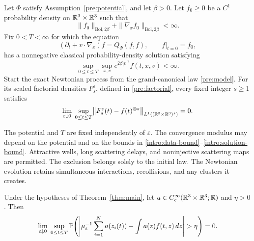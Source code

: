 \begin{maintheorem}\label{thm:main}
Let $\Phi$ satisfy Assumption~\ref{pre:potential}, and let $\beta>0$.
Let $f_0\ge0$ be a $C^1$ probability density on $\mathbb R^3\times\mathbb R^3$ such that
\begin{equation}\label{intro:data-bound}
 \|f_0\|_{\mathrm{Bol},2\beta}
 +\|\nabla_xf_0\|_{\mathrm{Bol},2\beta}<\infty.
\end{equation}
Fix $0<T<\infty$ for which the equation
\begin{equation}\label{intro:boltzmann}
 (\partial_t+v\cdot\nabla_x)f=Q_\Phi(f,f),
 \qquad f|_{t=0}=f_0,
\end{equation}
has a nonnegative classical probability-density solution satisfying
\begin{equation}\label{intro:solution-bound}
 \sup_{0\le t\le T}\sup_{x,v}
 e^{2\beta|v|^2}f(t,x,v)<\infty.
\end{equation}
Start the exact Newtonian process from the grand-canonical law
\eqref{pre:model}. For its scaled factorial densities
$F_s^\varepsilon$, defined in \eqref{pre:factorial}, every fixed
integer $s\ge1$ satisfies
\begin{equation}\label{intro:chaos}
 \lim_{\varepsilon\downarrow0}\;
 \sup_{0\le t\le T}
 \bigl\|F_s^\varepsilon(t)-f(t)^{\otimes s}\bigr\|_
 {L^1((\mathbb R^3\times\mathbb R^3)^s)}=0.
\end{equation}
\end{maintheorem}

The potential and $T$ are fixed independently of $\varepsilon$.
The convergence modulus may depend on the potential and on the bounds
in \eqref{intro:data-bound}--\eqref{intro:solution-bound}.
Attractive wells, long scattering delays, and noninjective scattering
maps are permitted. The exclusion belongs solely to the initial law.
The Newtonian evolution retains simultaneous interactions,
recollisions, and any clusters it creates.

\begin{maincorollary}\label{cor:empirical}
Under the hypotheses of Theorem~\ref{thm:main}, let
$a\in C_c^\infty(\mathbb R^3\times\mathbb R^3;\mathbb R)$ and $\eta>0$. Then
\begin{equation}\label{intro:empirical}
 \lim_{\varepsilon\downarrow0}\;
 \sup_{0\le t\le T}
 \PP\!\left(
 \left|\mu_\varepsilon^{-1}\sum_{i=1}^{N}a(z_i(t))
       -\int a(z)f(t,z)\,dz\right|>\eta\right)=0.
\end{equation}
\end{maincorollary}

